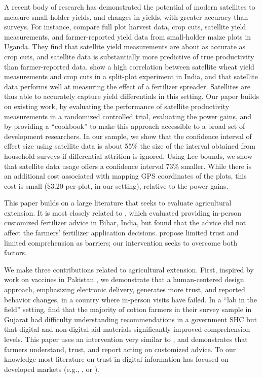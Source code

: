 \documentclass{article}
\begin{document}
A recent body of research has demonstrated the potential of modern satellites to measure small-holder yields, and changes in yields, with greater accuracy than surveys. For instance, \citet{Lobell2019EyesAnalysis} compare full plot harvest data, crop cuts, satellite yield measurements, and farmer-reported yield data from small-holder maize plots in Uganda. They find that satellite yield measurements are about as accurate as crop cuts, and satellite data is substantially more predictive of true productivity than farmer-reported data. \citet{Jain2019TheData} show a high correlation between satellite wheat yield measurements and crop cuts in a split-plot experiment in India, and that satellite data performs well at measuring the effect of a fertilizer spreader. Satellites are thus able to accurately capture yield differentials in this setting. Our paper builds on existing work, by evaluating the performance of satellite productivity measurements in a randomized controlled trial, evaluating the power gains, and by providing a ``cookbook'' to make this approach accessible to a broad set of development researchers. In our sample, we show that the confidence interval of effect size using satellite data is about 55\% the size of the interval obtained from household surveys if differential attrition is ignored. Using Lee bounds, we show that satellite data usage offers a confidence interval 73\% smaller. While there is an additional cost associated with mapping GPS coordinates of the plots, this cost is small (\$3.20 per plot, in our setting), relative to the power gains. 

This paper builds on a large literature that seeks to evaluate agricultural extension. It is most closely related to \citet{Fishman2016CanBihar}, which evaluated providing in-person customized fertilizer advice in Bihar, India, but found that the advice did not affect the farmers' fertilizer application decisions. \citet{Fishman2016CanBihar} propose limited trust and limited comprehension as barriers; our intervention seeks to overcome both factors. 

We make three contributions related to agricultural extension. First, inspired by work on vaccines in Pakistan \citep{Usman2011RandomizedEducation}, we demonstrate that a human-centered design approach, emphasizing electronic delivery, generates more trust, and reported behavior changes, in a country where in-person visits have failed. In a ``lab in the field'' setting, \citet{Cole2017TheAgriculture} find that the majority of cotton farmers in their survey sample in Gujarat had difficulty understanding recommendations in a government SHC but that digital and non-digital aid materials significantly improved comprehension levels. This paper uses an intervention very similar to \citet{Cole2017TheAgriculture}, and demonstrates that farmers understand, trust, and report acting on customized advice. To our knowledge most literature on trust in digital information has focused on developed markets (e.g., \citet{Sillence2006AAdvice}, or \citet{Bonhard2006KnowingSystems}).
\end{document}
